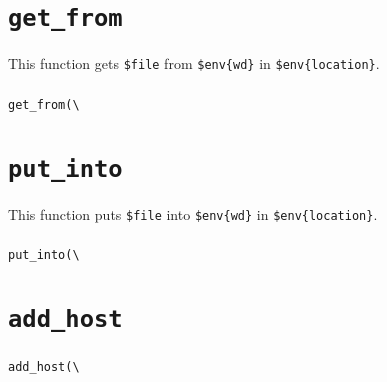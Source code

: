 \documentclass[a4paper,10pt]{report}
\def\|{\verb|} %|
\begin{document}
\section{\texttt{get\_from}}

This function gets \texttt{\$file} from \texttt{\$env\{wd\}} in
\texttt{\$env\{location\}}.

\subsubsection{\format}

\begin{boxnote}
\begin{alltt}
get_from(\|\|%\textit{env}, $file);
\end{alltt}
\end{boxnote}
\vspace{\baselineskip}

\section{\texttt{put\_into}}

This function puts \texttt{\$file} into \texttt{\$env\{wd\}} in
\texttt{\$env\{location\}}.

\subsubsection{\format}

\begin{boxnote}
\begin{alltt}
put_into(\|\|%\textit{env}, $file);
\end{alltt}
\end{boxnote}
\vspace{\baselineskip}


\section{\texttt{add\_host}}

\subsubsection{\format}

\begin{boxnote}
\begin{alltt}
add_host(\|\|%\textit{env});
\end{alltt}
\end{boxnote}
\end{document}
